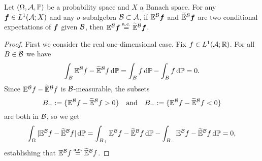 \begin{prop}\label{prop:CE-uniqueness}
  Let $(\Omega,\mathcal{A},\mathbb{P})$ be a probability space and $X$ a Banach space.
  For any $\bm{f} \in L^1(\mathcal{A};X)$ and any $\sigma$-subalgebra $\mathcal{B} \subset \mathcal{A}$, if $\mathbb{E}^{\mathcal{B}}\bm{f}$ and $\widetilde{\mathbb{E}}^{\mathcal{B}}\bm{f}$ are two conditional expectations of $\bm{f}$ given $\mathcal{B}$, then $\mathbb{E}^{\mathcal{B}}\bm{f} \stackrel{\mathrm{a.e.}}{=} \widetilde{\mathbb{E}}^{\mathcal{B}} \bm{f}$.
\end{prop}

\begin{proof}
  First we consider the real one-dimensional case.
  Fix $f \in L^1(\mathcal{A};\mathbb{R})$.
  For all $B \in \mathcal{B}$ we have
  \begin{equation*}
    \int_B \mathbb{E}^{\mathcal{B}}f - \widetilde{\mathbb{E}}^{\mathcal{B}}f \, \mathrm{d}\mathbb{P} = \int_B f \, \mathrm{d}\mathbb{P} - \int_B f \, \mathrm{d}\mathbb{P} = 0.
  \end{equation*}
  Since $\mathbb{E}^{\mathcal{B}}f - \widetilde{\mathbb{E}}^{\mathcal{B}}f$ is $\mathcal{B}$-measurable, the subsets
  \begin{equation*}
    B_+ := \{ \mathbb{E}^{\mathcal{B}}f - \widetilde{\mathbb{E}}^{\mathcal{B}}f > 0\} \quad \text{and} \quad B_- := \{\mathbb{E}^{\mathcal{B}}f - \widetilde{\mathbb{E}}^{\mathcal{B}}f < 0\}
  \end{equation*}
  are both in $\mathcal{B}$, so we get
  \begin{equation*}
    \int_\Omega |\mathbb{E}^{\mathcal{B}}f - \widetilde{\mathbb{E}}^{\mathcal{B}}f | \, \mathrm{d}\mathbb{P}
    = \int_{B_+}  \mathbb{E}^{\mathcal{B}}f - \widetilde{\mathbb{E}}^{\mathcal{B}}f \, \mathrm{d}\mathbb{P}
    -  \int_{B_-}  \mathbb{E}^{\mathcal{B}}f - \widetilde{\mathbb{E}}^{\mathcal{B}}f \, \mathrm{d}\mathbb{P}
    = 0,
  \end{equation*}
  establishing that $\mathbb{E}^{\mathcal{B}}f \stackrel{\mathrm{a.e.}}{=} \widetilde{\mathbb{E}}^{\mathcal{B}}f$.


\end{proof}
